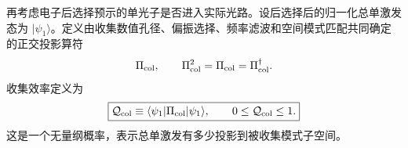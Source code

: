 \begin{definition}[条件单激发的收集投影]
再考虑电子后选择预示的单光子是否进入实际光路。设后选择后的归一化总单激发态为 $|\psi_1\rangle$。定义由收集数值孔径、偏振选择、频率滤波和空间模式匹配共同确定的正交投影算符
\begin{equation*}
\Pi_{\rm col},
\qquad
\Pi_{\rm col}^2=\Pi_{\rm col}=\Pi_{\rm col}^\dagger.
\end{equation*}
收集效率定义为
\begin{equation}
\boxed{
\mathcal Q_{\rm col}
\equiv\langle\psi_1|\Pi_{\rm col}|\psi_1\rangle,
\qquad
0\le\mathcal Q_{\rm col}\le1.}
\label{eq:collection-heralding-efficiency-dp19}
\end{equation}
这是一个无量纲概率，表示总单激发有多少投影到被收集模式子空间。
\end{definition}

